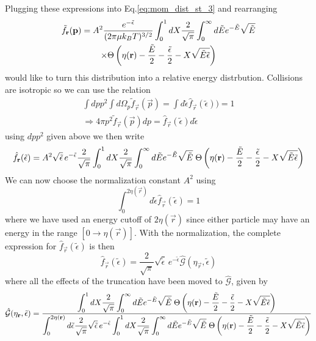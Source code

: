 Plugging these expressions into Eq.\ref{eq:mom_dist_st_3} and rearranging
\begin{multline}
	\tilde{f}_{\mathbf{r}}(\mathbf{p}) = A^2 \frac{e^{-\tilde{\epsilon}}}{(2 \pi \mu k_B T)^{3/2}} \int_0^1 dX \frac{2}{\sqrt{\pi}} \int_0^\infty d \tilde{E} e^{-\tilde{E}}\sqrt{\tilde{E}} \\
	\times \Theta \left( {\eta(\mathbf{r}) - \frac{\tilde{E}}{2} - \frac{\tilde{\epsilon}}{2} - X \sqrt{\tilde{E}\tilde{\epsilon}}} \right)
\end{multline}
would like to turn this distribution into a relative energy distrbution. 
Collisions are isotropic so we can use the relation
\begin{equation}
\begin{split}
	\int dp p^2 \int d \Omega_p \tilde{f}_{\vec{r}}(\vec{p}) = \int d \tilde{\epsilon} \hat{f}_{\vec{r}}(\tilde{\epsilon})) = 1 \\
	\Rightarrow 4 \pi p^2 \tilde{f}_{\vec{r}}(\vec{p}) dp = \hat{f}_{\vec{r}}(\tilde{\epsilon}) d \tilde{\epsilon}
\end{split}
\end{equation}
using $dp p^2$ given above we then write 
\begin{equation} \label{eq:mom_dist_st_4}
	\hat{f}_{\mathbf{r}}(\tilde{\epsilon}) = A^2 \sqrt{\tilde{\epsilon}} \, e^{-\tilde{\epsilon}} \frac{2}{\sqrt{\pi}} \int_0^1 dX \frac{2}{\sqrt{\pi}} \int_0^\infty d \tilde{E} e^{-\tilde{E}}\sqrt{\tilde{E}} \; \Theta \left( {\eta(\mathbf{r}) - \frac{\tilde{E}}{2} - \frac{\tilde{\epsilon}}{2} - X \sqrt{\tilde{E}\tilde{\epsilon}}} \right)
\end{equation}
We can now choose the normalization constant $A^2$ using
\begin{equation*}
	\int_0^{2\eta(\vec{r})} d \tilde{\epsilon} \hat{f}_{\vec{r}}(\tilde{\epsilon}) = 1
\end{equation*}
where we have used an energy cutoff of $2 \eta(\vec{r})$ since either particle may have an energy in the range $[0 \rightarrow \eta(\vec{r})]$. 
With the normalization, the complete expression for $\hat{f}_{\vec{r}}(\tilde{\epsilon})$ is then
\begin{equation}
	\hat{f}_{\vec{r}}(\tilde{\epsilon}) = \frac{2}{\sqrt{\pi}} \sqrt{\tilde{\epsilon}} \, e^{-\tilde{\epsilon}} \hat{\mathcal{G}}(\eta_{\vec{r}}, \tilde{\epsilon})
\end{equation}
where all the effects of the truncation have been moved to $\hat{\mathcal{G}}$, given by 
\begin{equation*}
	\hat{\mathcal{G}}(\eta_{\mathbf{r}}, \tilde{\epsilon}) = \frac{\displaystyle
	\int_0^1 dX \frac{2}{\sqrt{\pi}} \int_0^\infty d \tilde{E} e^{-\tilde{E}}\sqrt{\tilde{E}} \; \Theta \left( {\eta(\mathbf{r}) - \frac{\tilde{E}}{2} - \frac{\tilde{\epsilon}}{2} - X \sqrt{\tilde{E}\tilde{\epsilon}}} \right)}
	{\displaystyle \int_0^{2\eta(\mathbf{r})} d \tilde{\epsilon} \frac{2}{\sqrt{\pi}} \sqrt{\tilde{\epsilon}} \, e^{-\tilde{\epsilon}} \int_0^1 dX \frac{2}{\sqrt{\pi}} \int_0^\infty d \tilde{E} e^{-\tilde{E}}\sqrt{\tilde{E}} \; \Theta \left( {\eta(\mathbf{r}) - \frac{\tilde{E}}{2} - \frac{\tilde{\epsilon}}{2} - X \sqrt{\tilde{E}\tilde{\epsilon}}} \right)}
\end{equation*}
